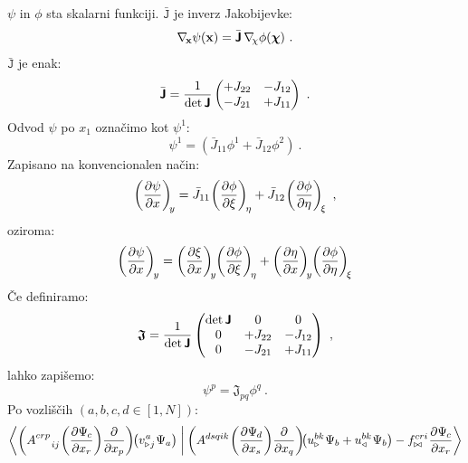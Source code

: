 $\psi$ in $\phi$ sta skalarni funkciji. $\bar{\texttt{J}}$ je inverz Jakobijevke:
\begin{equation}
   \mathbf{\nabla_{\mkern-3mu x}} \psi(\mathbf{x}) = \bar{\bm{\mathsf{J}}} \mkern3mu \mathbf{\nabla_{\mkern-4mu \chi}} \phi(\bm{\chi}) \ .
\end{equation}
$\bar{\texttt{J}}$ je enak:
\begin{equation}
   \bar{\bm{\mathsf{J}}}
   =
   \frac{1}{\det \bm{\mathsf{J}}}
   \begin{pmatrix}
      +J_{22} & -J_{12} \\
      -J_{21} & +J_{11}
   \end{pmatrix}
   \ .
\end{equation}
Odvod $\psi$ po $x_1$ označimo kot $\psi^1$:
\begin{equation}
   \psi^1 = \left(\bar{J}_{11} \phi^1 + \bar{J}_{12} \phi^2 \right) \ .
\end{equation}
Zapisano na konvencionalen način:
\begin{equation}
   \left(\frac{\partial \psi}{\partial x}\right)_{\mkern-4mu y}
   =
   \bar{J}_{11} \mkern-2mu \left(\frac{\partial \phi}{\partial \xi}\right)_{\mkern-3mu \eta}
   +
   \bar{J}_{12} \mkern-2mu \left(\frac{\partial \phi}{\partial \eta}\right)_{\mkern-3mu \xi} \ ,
\end{equation}
oziroma:
\begin{equation}
   \left(\frac{\partial \psi}{\partial x} \right)_{\mkern-3mu y}
   =
   \left(\frac{\partial \xi}{\partial x} \right)_{\mkern-4mu y}
   \mkern-4mu \left(\frac{\partial \phi}{\partial \xi}\right)_{\mkern-3mu \eta}
   +
   \left(\frac{\partial \eta}{\partial x}\right)_{\mkern-4mu y}
   \mkern-4mu \left(\frac{\partial \phi}{\partial \eta}\right)_{\mkern-3mu \xi}
\end{equation}
Če definiramo:
\begin{equation}
   \bm{\mathsf{\mathfrak{J}}}
   =
   \frac{1}{\det \bm{\mathsf{J}}}
   \begin{pmatrix}
      \det \bm{\mathsf{J}} & 0       & 0       \\
      0                & +J_{22} & -J_{12} \\
      0                & -J_{21} & +J_{11}
   \end{pmatrix} \ ,
\end{equation}
lahko zapišemo:
\begin{equation}
   \psi^p = \mathfrak{J}_{pq} \phi^{q} \ .
   \label{eq:refToEmt}
\end{equation}
Po vozliščih $(a, b, c, d \in [1,N])$:
\begin{equation}
   \braket{
      \qty(A^{c r p}_{\mkern28mu i j} \mkern1mu    \qty( \pdv{\Psi_{\mkern-1mu c}}{x_r} ) \pdv{}{x_p} ) \mkern-2mu
      \qty(v^{\mkern1mu a}_{\triangleright \mkern1mu j} \mkern1mu \Psi_a ) \mkern5mu  }
   {
      \mkern4mu \qty(A^{d s q i k} \mkern1mu     \qty( \pdv{\Psi_{\mkern-1mu d}}{x_s} ) \pdv{}{x_q} ) \mkern-4mu
      \qty(u^{b k}_\triangleright \mkern1mu \Psi_b + u^{b k}_\triangleleft \mkern1mu \Psi_b )
      -
      f^{c r i}_{\bowtie} \mkern1mu \pdv{\Psi_{\mkern-1mu c}}{x_r} }
\end{equation}
